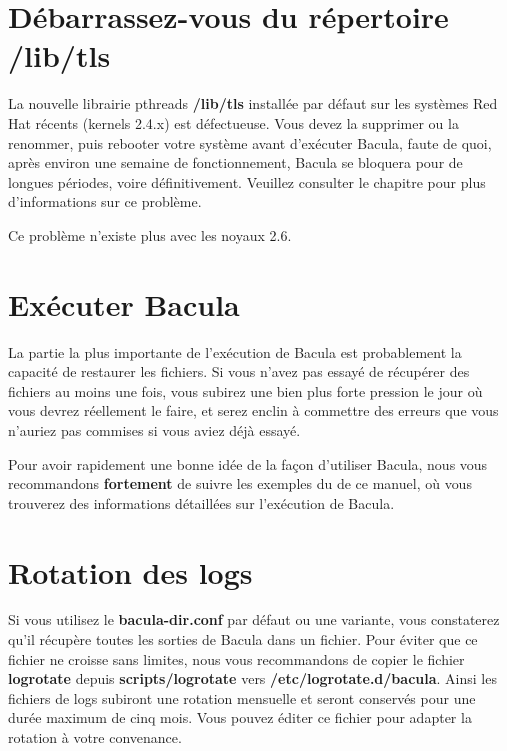 {{{{{{{{{\section{D\'ebarrassez-vous du r\'epertoire /lib/tls}

La nouvelle librairie pthreads {\bf /lib/tls} install\'ee par d\'efaut sur les
syst\`emes Red Hat r\'ecents (kernels 2.4.x) est d\'efectueuse. Vous devez la
supprimer ou la renommer, puis rebooter votre syst\`eme avant d'ex\'ecuter
Bacula, faute de quoi, apr\`es environ une semaine de fonctionnement, Bacula
se bloquera pour de longues p\'eriodes, voire d\'efinitivement. Veuillez consulter 
le chapitre  pour plus
d'informations sur ce probl\`eme. 

Ce probl\`eme n'existe plus avec les noyaux 2.6.

\label{Running1}

\section{Ex\'ecuter Bacula}

La partie la plus importante de l'ex\'ecution de Bacula est probablement la
capacit\'e de restaurer les fichiers. Si vous n'avez pas essay\'e de
r\'ecup\'erer des fichiers au moins une fois, vous subirez une bien plus forte
pression le jour o\`u vous devrez r\'eellement le faire, et serez enclin \`a
commettre des erreurs que vous n'auriez pas commises si vous aviez d\'ej\`a
essay\'e. 

Pour avoir rapidement une bonne id\'ee de la fa\c{c}on d'utiliser Bacula,
nous vous recommandons {\bf fortement} de suivre les exemples du 
 de ce manuel,
o\`u vous trouverez des informations d\'etaill\'ees sur l'ex\'ecution de
Bacula. 

\section{Rotation des logs}

Si vous utilisez le {\bf bacula-dir.conf} par d\'efaut ou une variante, vous
constaterez qu'il r\'ecup\`ere toutes les sorties de Bacula dans un fichier.
Pour \'eviter que ce fichier ne croisse sans limites, nous vous recommandons
de copier le fichier {\bf logrotate} depuis {\bf scripts/logrotate} vers {\bf
/etc/logrotate.d/bacula}. Ainsi les fichiers de logs subiront une rotation
mensuelle et seront conserv\'es pour une dur\'ee maximum de cinq mois. Vous
pouvez \'editer ce fichier pour adapter la rotation \`a votre convenance. 

}}}}}}}}}

